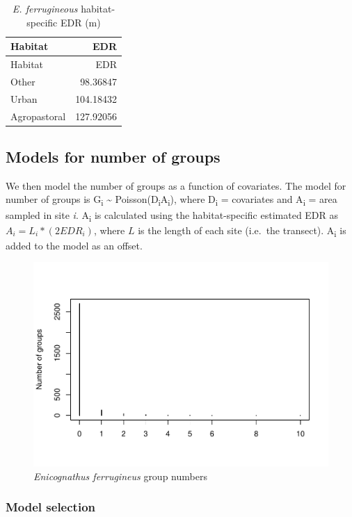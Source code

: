 \documentclass[]{article}
\begin{document}
\begin{longtable}[]{@{}lr@{}}
\caption{\textit{E. ferrugineous} habitat-specific EDR
(m)}\tabularnewline
\toprule
Habitat & EDR\tabularnewline
\midrule
\endfirsthead
\toprule
Habitat & EDR\tabularnewline
\midrule
\endhead
Other & 98.36847\tabularnewline
Urban & 104.18432\tabularnewline
Agropastoral & 127.92056\tabularnewline
\bottomrule
\end{longtable}

\subsection{Models for number of
groups}\label{models-for-number-of-groups}

We then model the number of groups as a function of covariates. The
model for number of groups is G\textsubscript{i} \textasciitilde{}
Poisson(D\textsubscript{i}A\textsubscript{i}), where D\textsubscript{i}
= covariates and A\textsubscript{i} = area sampled in site \emph{i}.
A\textsubscript{i} is calculated using the habitat-specific estimated
EDR as \(A_i = L_i * (2EDR_i)\), where \(L\) is the length of each site
(i.e.~the transect). A\textsubscript{i} is added to the model as an
offset.

\begin{figure}[H]
\includegraphics{Patagonia_parrots_density_analysis_files/figure-latex/unnamed-chunk-6-1} \caption{\textit{Enicognathus ferrugineus} group numbers }\label{fig:unnamed-chunk-6}
\end{figure}

\subsubsection{Model selection}\label{model-selection}
\end{document}
